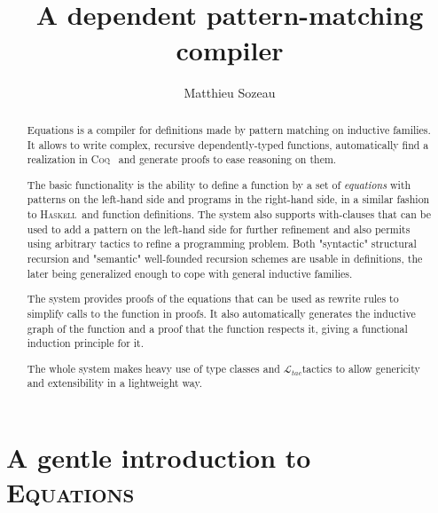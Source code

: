 \documentclass{article}
\author{Matthieu Sozeau}
\title{\Equations\\
  A dependent pattern-matching compiler}
\def\name#1{\textsc{#1}~}
\def\Coq{\name{Coq}}
\def\Haskell{\name{Haskell}}
\def\text#1{#1}
\def\Ltac{$\mathcal{\text{L}}_{\text{tac}}$}
\def\Equations{\name{Equations}}
\begin{document}
\maketitle

\begin{abstract}
  Equations is a compiler for definitions made by pattern matching on
  inductive families. It allows to write complex, recursive
  dependently-typed functions, automatically find a realization in \Coq 
  and generate proofs to ease reasoning on them.

  The basic functionality is the ability to define a function by a set
  of \textit{equations} with patterns on the left-hand side and programs
  in the right-hand side, in a similar fashion to \Haskell and \Agda
  function definitions. The system also supports with-clauses that can
  be used to add a pattern on the left-hand side for further refinement
  and also permits using arbitrary tactics to refine a programming
  problem. Both "syntactic" structural recursion and "semantic" well-founded 
  recursion schemes are usable in definitions, the later being
  generalized enough to cope with general inductive families.
  
  The system provides proofs of the equations that can be used as
  rewrite rules to simplify calls to the function in proofs. It also
  automatically generates the inductive graph of the function and a
  proof that the function respects it, giving a functional induction
  principle for it. 
  
  The whole system makes heavy use of type classes and \Ltac tactics to
  allow genericity and extensibility in a lightweight way.
\end{abstract}

\section{A gentle introduction to \Equations}



  
\end{document}
